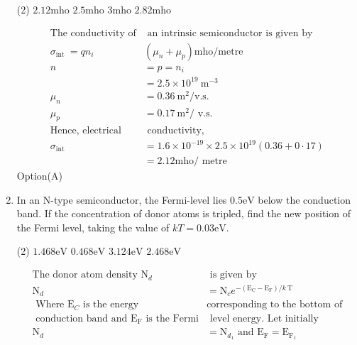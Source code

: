 \begin{enumerate}
\begin{tasks}(2)
	\task[\textbf{a.}]$2.12 \mathrm{mho}$  
	\task[\textbf{b.}]$2.5 \mathrm{mho}$
	\task[\textbf{c.}] $3 \mathrm{mho}$
	\task[\textbf{d.}] $2.82 \mathrm{mho}$
\end{tasks}
\begin{answer}
	$$
	\begin{aligned}
	\text{The conductivity of}&\text{ an intrinsic semiconductor is given by}\\
	\sigma_{\text {int }}=q n_{i} &\left(\mu_{n}+\mu_{p}\right) \mathrm{mho} / \mathrm{metre} \\
	n &=p=n_{i} \\
	&=2.5 \times 10^{19} \mathrm{~m}^{-3} \\
	\mu_{n} &=0.36 \mathrm{~m}^{2} / \mathrm{v} . \mathrm{s} . \\
	\mu_{p} &=0.17 \mathrm{~m}^{2} / \text { v.s. }\\
	\text{Hence, electrical }&\text { conductivity,}\\
	\sigma_{\text {int }} &=1.6 \times 10^{-19} \times 2.5 \times 10^{19}(0.36+0 \cdot 17) \\
	&=2.12 \mathrm{mho} / \text { metre }
	\end{aligned}
	$$
	Option(A)
\end{answer}
 \item In an $\mathrm{N}$-type semiconductor, the Fermi-level lies $0.5 \mathrm{eV}$ below the conduction band. If the concentration of donor atoms is tripled, find the new position of the Fermi level, taking the value of $k T=0.03 \mathrm{eV}$.
 \begin{tasks}(2)
 	\task[\textbf{a.}] $1.468 \mathrm{eV}$ 
 	\task[\textbf{b.}]$0.468 \mathrm{eV}$ 
 	\task[\textbf{c.}]$3.124 \mathrm{eV}$  
 	\task[\textbf{d.}]$2.468 \mathrm{eV}$  
 \end{tasks}
 \begin{answer}
 	$$\begin{aligned}
 	\text{The donor atom density $\mathrm{N}_{d}$}&\text{ is given by}\\
 	\mathrm{N}_{d}&=\mathrm{N}_{c} e^{-\left(\mathrm{E}_{\mathrm{C}}-\mathrm{E}_{\mathrm{F}}\right) / k \mathrm{~T}}\\
 \text{	Where $\mathrm{E}_{C}$ is the energy }&\text{corresponding to the bottom of}\\
 \text{ conduction band and $\mathrm{E}_{\mathrm{F}}$ is the Fermi}&\text{ level energy. Let initially }\\
 	\mathrm{N}_{d} &=\mathrm{N}_{d_{1}} \text { and } \mathrm{E}_{\mathrm{F}}=\mathrm{E}_{\mathrm{F}_{1}} \\

\end{aligned}$$
\end{answer}
\end{enumerate}
